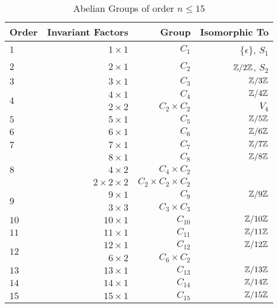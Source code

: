 \begin{center}
  \begin{table}
    \begin{tabular}{ l | r | r | r }
      Order & Invariant Factors & Group & Isomorphic To \\
      \midrule
      $1$ & $1 \times 1$ & $C_1$ & $\{ \epsilon \}$, $S_1$ \\
      \midrule
      $2$ & $2 \times 1$ & $C_2$ & $\mathbb{Z}/2\mathbb{Z}$, $S_2$ \\
      \midrule
      $3$ & $3 \times 1$ & $C_3$ & $\mathbb{Z}/3\mathbb{Z}$ \\
      \midrule
      \multirow{2}{*}{$4$} & $4 \times 1$ & $C_4$ & $\mathbb{Z}/4\mathbb{Z}$ \\
          & $2 \times 2$ & $C_2 \times C_2$ & $V_4$ \\
      \midrule
      $5$ & $5 \times 1$ & $C_5$ & $\mathbb{Z}/5\mathbb{Z}$ \\
      \midrule
      $6$ & $6 \times 1$ & $C_6$ & $\mathbb{Z}/6\mathbb{Z}$ \\
      \midrule
      $7$ & $7 \times 1$ & $C_7$ & $\mathbb{Z}/7\mathbb{Z}$ \\
      \midrule
      \multirow{3}{*}{$8$} & $8 \times 1$ & $C_8$ & $\mathbb{Z}/8\mathbb{Z}$ \\
          & $4 \times 2$ & $C_4 \times C_2$ & \\
          & $2 \times 2 \times 2$ & $C_2 \times C_2 \times C_2$ &  \\
      \midrule
      \multirow{2}{*}{$9$} & $9 \times 1$ & $C_9$ & $\mathbb{Z}/9\mathbb{Z}$ \\
          & $3 \times 3$ & $C_3 \times C_3$ & \\
      \midrule
      $10$ & $10 \times 1$ & $C_{10}$ & $\mathbb{Z}/10\mathbb{Z}$ \\
      \midrule
      $11$ & $11 \times 1$ & $C_{11}$ & $\mathbb{Z}/11\mathbb{Z}$ \\
      \midrule
      \multirow{2}{*}{$12$} & $12 \times 1$ & $C_{12}$ & $\mathbb{Z}/12\mathbb{Z}$ \\
          & $6 \times 2$ & $C_6 \times C_2$ & \\
      \midrule
      $13$ & $13 \times 1$ & $C_{13}$ & $\mathbb{Z}/13\mathbb{Z}$ \\
      \midrule
      $14$ & $14 \times 1$ & $C_{14}$ & $\mathbb{Z}/14\mathbb{Z}$ \\
      \midrule
      $15$ & $15 \times 1$ & $C_{15}$ & $\mathbb{Z}/15\mathbb{Z}$ \\
      \bottomrule
    \end{tabular}
    \caption{Abelian Groups of order $n \le 15$}~\label{tab:abelian-groups}
  \end{table}
\end{center}


